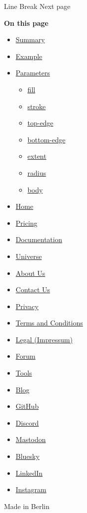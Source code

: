 \href{/docs/reference/text/linebreak/}{\pandocbounded{}}

{ Line Break } { Next page }

\textbf{On this page}

\begin{itemize}
\tightlist
\item
  \hyperref[summary]{Summary}
\item
  \hyperref[example]{Example}
\item
  \hyperref[parameters]{Parameters}

  \begin{itemize}
  \tightlist
  \item
    \hyperref[parameters-fill]{fill}
  \item
    \hyperref[parameters-stroke]{stroke}
  \item
    \hyperref[parameters-top-edge]{top-edge}
  \item
    \hyperref[parameters-bottom-edge]{bottom-edge}
  \item
    \hyperref[parameters-extent]{extent}
  \item
    \hyperref[parameters-radius]{radius}
  \item
    \hyperref[parameters-body]{body}
  \end{itemize}
\end{itemize}

\begin{itemize}
\tightlist
\item
  \href{/}{Home}
\item
  \href{/pricing/}{Pricing}
\item
  \href{/docs/}{Documentation}
\item
  \href{/universe/}{Universe}
\item
  \href{/about/}{About Us}
\item
  \href{/contact/}{Contact Us}
\item
  \href{/privacy/}{Privacy}
\item
  \href{https://typst.app/terms}{Terms and Conditions}
\item
  \href{/legal/}{Legal (Impressum)}
\end{itemize}

\begin{itemize}
\tightlist
\item
  \href{https://forum.typst.app}{Forum}
\item
  \href{/tools/}{Tools}
\item
  \href{/blog/}{Blog}
\item
  \href{https://github.com/typst/}{GitHub}
\item
  \href{https://discord.gg/2uDybryKPe}{Discord}
\item
  \href{https://mastodon.social/@typst}{Mastodon}
\item
  \href{https://bsky.app/profile/typst.app}{Bluesky}
\item
  \href{https://www.linkedin.com/company/typst/}{LinkedIn}
\item
  \href{https://instagram.com/typstapp/}{Instagram}
\end{itemize}

Made in Berlin
